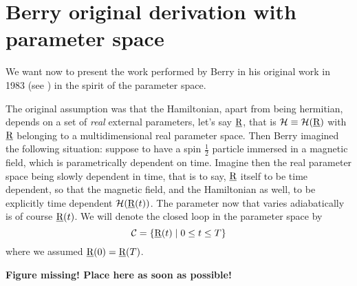 \section{Berry original derivation with parameter space}
We want now to present the work performed by Berry in his original work in 1983 (see \cite{berry1985classical}) in the spirit of the parameter space.

The original assumption was that the Hamiltonian, apart from being hermitian, depends on a set of \emph{real} external parameters, let's say $ \underline{\textrm{R}} $, that is $ \mathcal{H}\equiv\mathcal{H}(\underline{\textrm{R}}) $ with $ \underline{\textrm{R}} $ belonging to a multidimensional real parameter space.
Then Berry imagined the following situation: 
suppose to have a spin $ \frac{1}{2} $ particle immersed in a magnetic field, which is parametrically dependent on time. Imagine then the real parameter space being slowly dependent in time, that is to say, $ \underline{\textrm{R}} $ itself to be time dependent, so that the magnetic field, and the Hamiltonian as well, to be explicitly time dependent $ \mathcal{H}(\underline{\textrm{R}}(t)) $. The parameter now that varies adiabatically is of course $ \underline{\textrm{R}}(t) $.
We will denote the closed loop in the parameter space by
\begin{equation}
\mathcal{C}=\left\{\underline{\textrm{R}}(t)\mid 0\leq t\leq T \right\}
\label{eq:Curve_C}
\end{equation}
where we assumed $ \underline{\textrm{R}}(0)=\underline{\textrm{R}}(T) $.

\textbf{Figure missing! Place here as soon as possible!}

